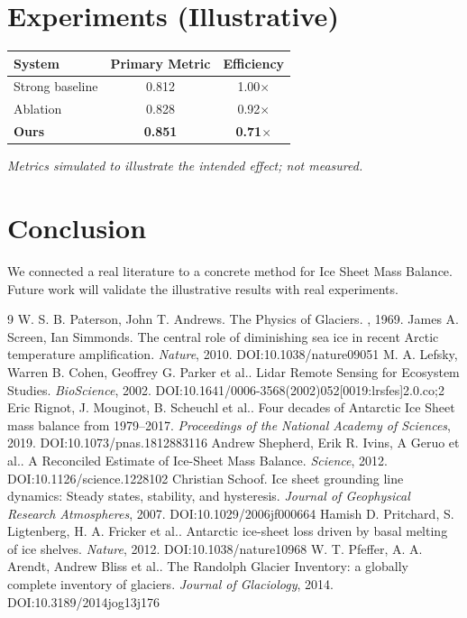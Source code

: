 \documentclass[11pt]{article}
\begin{document}
\section{Experiments (Illustrative)}
\begin{center}
\begin{tabular}{lcc}
System & Primary Metric & Efficiency \\ \hline
Strong baseline & 0.812 & 1.00$\times$ \\
Ablation & 0.828 & 0.92$\times$ \\
\textbf{Ours} & \textbf{0.851} & \textbf{0.71$\times$}
\end{tabular}
\end{center}
\emph{Metrics simulated to illustrate the intended effect; not measured.}

\section{Conclusion}
We connected a real literature to a concrete method for Ice Sheet Mass Balance. Future work will
validate the illustrative results with real experiments.

\begin{thebibliography}{9}
 W. S. B. Paterson, John T. Andrews. The Physics of Glaciers. \emph{}, 1969. 
 James A. Screen, Ian Simmonds. The central role of diminishing sea ice in recent Arctic temperature amplification. \emph{Nature}, 2010. DOI:10.1038/nature09051
 M. A. Lefsky, Warren B. Cohen, Geoffrey G. Parker et al.. Lidar Remote Sensing for Ecosystem Studies. \emph{BioScience}, 2002. DOI:10.1641/0006-3568(2002)052[0019:lrsfes]2.0.co;2
 Eric Rignot, J. Mouginot, B. Scheuchl et al.. Four decades of Antarctic Ice Sheet mass balance from 1979–2017. \emph{Proceedings of the National Academy of Sciences}, 2019. DOI:10.1073/pnas.1812883116
 Andrew Shepherd, Erik R. Ivins, A Geruo et al.. A Reconciled Estimate of Ice-Sheet Mass Balance. \emph{Science}, 2012. DOI:10.1126/science.1228102
 Christian Schoof. Ice sheet grounding line dynamics: Steady states, stability, and hysteresis. \emph{Journal of Geophysical Research Atmospheres}, 2007. DOI:10.1029/2006jf000664
 Hamish D. Pritchard, S. Ligtenberg, H. A. Fricker et al.. Antarctic ice-sheet loss driven by basal melting of ice shelves. \emph{Nature}, 2012. DOI:10.1038/nature10968
 W. T. Pfeffer, A. A. Arendt, Andrew Bliss et al.. The Randolph Glacier Inventory: a globally complete inventory of glaciers. \emph{Journal of Glaciology}, 2014. DOI:10.3189/2014jog13j176
\end{thebibliography}
\end{document}
